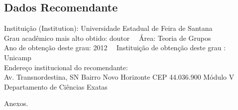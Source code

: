 \documentclass[11pt]{article}
\begin{document}
\subsection*{Dados Recomendante} 
	Instituição (Institution): Universidade Estadual de Feira de Santana
\\ 
	Grau acadêmico mais alto obtido: doutor
	\ \ Área: Teoria de Grupos
	\\
	Ano de obtenção deste grau: 2012
	\ \ 
	Instituição de obtenção deste grau : Unicamp
	\\ 
	Endereço institucional do recomendante: \\ Av. Transnordestina, SN 
Bairro Novo Horizonte
CEP 44.036.900
Módulo V 
Departamento de Ciências Exatas  
\begin{center}
Anexos.
\end{center}
\end{document}
